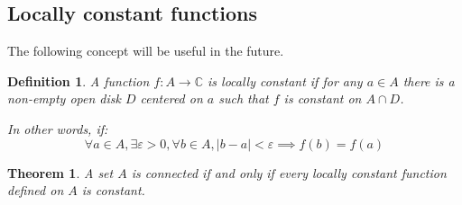 \documentclass{article}
\newtheorem*{defi}{Definition}
\newtheorem*{thm*}{Theorem}
\begin{document}
\subsection{Locally constant functions}
The following concept will be useful in the future.

\begin{defi}
    A function $f: A \rightarrow \mathbb{C}$ is locally constant if for any $a\in A$ there is a non-empty open disk $D$ centered on $a$ such that $f$ is constant on $A\cap D$.

    In other words, if:
    $$ \forall a \in A, \exists \varepsilon >0, \forall b \in A, |b-a|< \varepsilon \implies f(b) = f(a) $$
\end{defi}

\begin{thm*}
    A set $A$ is connected if and only if every locally constant function defined on $A$ is constant.
\end{thm*}
\end{document}
